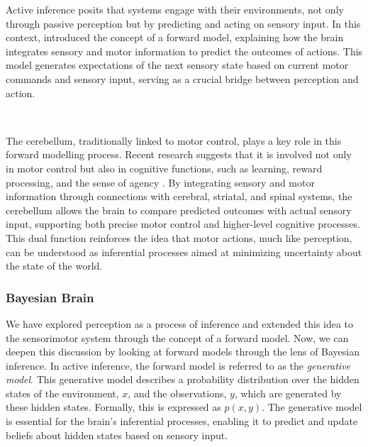 \documentclass{article}
\begin{document}
Active inference posits that systems engage with their environments, not only through passive perception but by predicting and acting on sensory input. In this context, \citet{miall1996forward} introduced the concept of a forward model, explaining how the brain integrates sensory and motor information to predict the outcomes of actions. This model generates expectations of the next sensory state based on current motor commands and sensory input, serving as a crucial bridge between perception and action.

\

The cerebellum, traditionally linked to motor control, plays a key role in this forward modelling process. Recent research suggests that it is involved not only in motor control but also in cognitive functions, such as learning, reward processing, and the sense of agency \citep{welniarz2021forward}. By integrating sensory and motor information through connections with cerebral, striatal, and spinal systems, the cerebellum allows the brain to compare predicted outcomes with actual sensory input, supporting both precise motor control and higher-level cognitive processes. This dual function reinforces the idea that motor actions, much like perception, can be understood as inferential processes aimed at minimizing uncertainty about the state of the world.


\subsubsection{Bayesian Brain}

We have explored perception as a process of inference and extended this idea to the sensorimotor system through the concept of a forward model. Now, we can deepen this discussion by looking at forward models through the lens of Bayesian inference. In active inference, the forward model is referred to as the \textit{generative model}. This generative model describes a probability distribution over the hidden states of the environment, $x$, and the observations, $y$, which are generated by these hidden states. Formally, this is expressed as $p(x, y)$. The generative model is essential for the brain’s inferential processes, enabling it to predict and update beliefs about hidden states based on sensory input.

\
\end{document}
